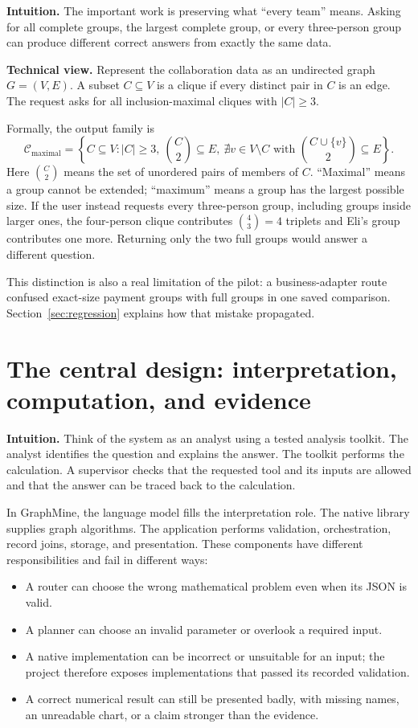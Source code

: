 \documentclass[11pt,a4paper]{article}
\newcommand{\intuition}[1]{\par\textbf{Intuition.} #1\par}
\newcommand{\technical}[1]{\par\textbf{Technical view.} #1\par}
\begin{document}
\intuition{The important work is preserving what ``every team'' means. Asking
for all complete groups, the largest complete group, or every three-person group
can produce different correct answers from exactly the same data.}

\technical{Represent the collaboration data as an undirected graph
$G=(V,E)$. A subset $C\subseteq V$ is a clique if every distinct pair in $C$ is
an edge. The request asks for all inclusion-maximal cliques with $|C|\geq 3$.}

Formally, the output family is
\begin{equation}
\mathcal{C}_{\mathrm{maximal}}=
\left\{C\subseteq V:
|C|\geq 3,\ \binom{C}{2}\subseteq E,\
\nexists v\in V\setminus C\text{ with }\binom{C\cup\{v\}}{2}\subseteq E
\right\}.
\end{equation}
Here $\binom{C}{2}$ means the set of unordered pairs of members of $C$.
``Maximal'' means a group cannot be extended; ``maximum'' means a group has the
largest possible size. If the user instead requests every three-person group,
including groups inside larger ones, the four-person clique contributes
$\binom{4}{3}=4$ triplets and Eli's group contributes one more. Returning only
the two full groups would answer a different question.

This distinction is also a real limitation of the pilot: a business-adapter
route confused exact-size payment groups with full groups in one saved
comparison. Section~\ref{sec:regression} explains how that mistake propagated.

\section{The central design: interpretation, computation, and evidence}

\intuition{Think of the system as an analyst using a tested analysis toolkit.
The analyst identifies the question and explains the answer. The toolkit performs
the calculation. A supervisor checks that the requested tool and its inputs are
allowed and that the answer can be traced back to the calculation.}

In GraphMine, the language model fills the interpretation role. The native
library supplies graph algorithms. The application performs validation,
orchestration, record joins, storage, and presentation. These components have
different responsibilities and fail in different ways:

\begin{itemize}
\item A router can choose the wrong mathematical problem even when its JSON is valid.
\item A planner can choose an invalid parameter or overlook a required input.
\item A native implementation can be incorrect or unsuitable for an input; the
  project therefore exposes implementations that passed its recorded validation.
\item A correct numerical result can still be presented badly, with missing
  names, an unreadable chart, or a claim stronger than the evidence.
\end{itemize}
\end{document}
